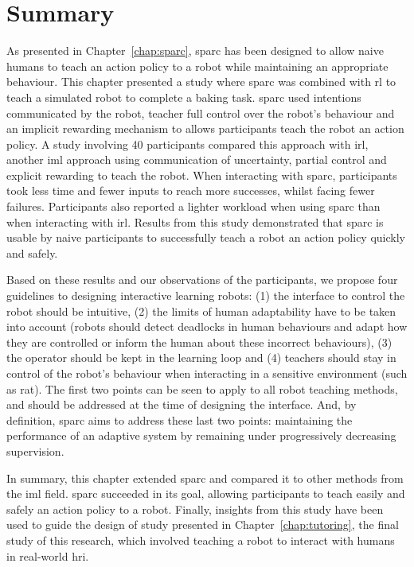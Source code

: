 \section{Summary}

As presented in Chapter~\ref{chap:sparc}, \gls{sparc} has been designed to allow naive humans to teach an action policy to a robot while maintaining an appropriate behaviour. This chapter presented a study where \gls{sparc} was combined with \gls{rl} to teach a simulated robot to complete a baking task. \gls{sparc} used intentions communicated by the robot, teacher full control over the robot's behaviour and an implicit rewarding mechanism to allows participants teach the robot an action policy. A study involving 40 participants compared this approach with \gls{irl}, another \gls{iml} approach using communication of uncertainty, partial control and explicit rewarding to teach the robot. When interacting with \gls{sparc}, participants took less time and fewer inputs to reach more successes, whilst facing fewer failures. Participants also reported a lighter workload when using \gls{sparc} than when interacting with \gls{irl}. Results from this study demonstrated that \gls{sparc} is usable by naive participants to successfully teach a robot an action policy quickly and safely.

Based on these results and our observations of the participants, we propose four guidelines to designing interactive learning robots: (1) the interface to control the robot should be intuitive, (2) the limits of human adaptability have to be taken into account (robots should detect deadlocks in human behaviours and adapt how they are controlled or inform the human about these incorrect behaviours), (3) the operator should be kept in the learning loop and (4) teachers should stay in control of the robot's behaviour when interacting in a sensitive environment (such as \gls{rat}). The first two points can be seen to apply to all robot teaching methods, and should be addressed at the time of designing the interface. And, by definition, \gls{sparc} aims to address these last two points: maintaining the performance of an adaptive system by remaining under progressively decreasing supervision.

In summary, this chapter extended \gls{sparc} and compared it to other methods from the \gls{iml} field. \gls{sparc} succeeded in its goal, allowing participants to teach easily and safely an action policy to a robot. Finally, insights from this study have been used to guide the design of study presented in Chapter~\ref{chap:tutoring}, the final study of this research, which involved teaching a robot to interact with humans in real-world \gls{hri}.


